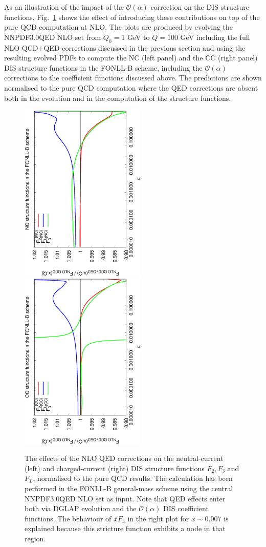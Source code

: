 As an illustration of the impact of the $\mathcal{O}(\alpha)$
correction on the DIS structure functions, Fig.~\ref{fig:StructFuncs}
shows the effect of introducing these contributions on top of the pure
QCD computation at NLO.
%
The plots are produced by evolving the
NNPDF3.0QED NLO set from $Q_0=1$ GeV to $Q=100$ GeV including the full
NLO QCD+QED corrections discussed in the previous section and using
the resulting evolved PDFs to compute the NC (left panel) and the CC
(right panel) DIS structure functions in the FONLL-B scheme, including
the $\mathcal{O}(\alpha)$ corrections to the coefficient functions
discussed above.
%
The predictions are shown normalised to the pure QCD computation where
the QED corrections are absent both in the evolution and in the
computation of the structure functions.

\begin{figure}[t]
\includegraphics[width=6cm,angle=270]{figs/NLOQEDCorrections_NC.eps}
\includegraphics[width=6cm,angle=270]{figs/NLOQEDCorrections_CC.eps}
\caption{The effects of the NLO QED corrections on the neutral-current
(left) and charged-current (right) DIS structure functions
$F_2, F_3$ and $F_L$, normalised to the pure QCD results.
%
The calculation has been performed in the FONLL-B general-mass scheme using the
central NNPDF3.0QED NLO
set as input.
%
Note that QED effects enter both via DGLAP evolution and the
$\mathcal{O}(\alpha)$ DIS coefficient functions.
%
The behaviour of $xF_3$ in the right plot for $x\sim 0.007$ is explained
because this stricture function exhibits a node in that region.
}
\label{fig:StructFuncs}
\end{figure}
